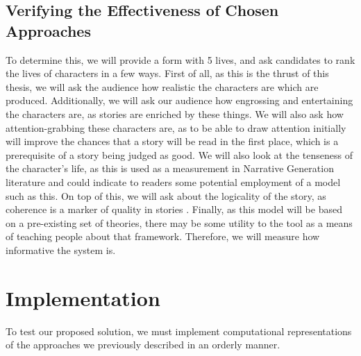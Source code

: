 \documentclass[12pt]{article}
\begin{document}
\subsection{Verifying the Effectiveness of Chosen Approaches}
To determine this, we will provide a form with 5 lives, and ask candidates to rank the lives of characters in a few ways. First of all, as this is the thrust of this thesis, we will ask the audience how realistic the characters are which are produced. Additionally, we will ask our audience how engrossing and entertaining the characters are, as stories are enriched by these things. We will also ask how attention-grabbing these characters are, as to be able to draw attention initially will improve the chances that a story will be read in the first place, which is a prerequisite of a story being judged as good. We will also look at the tenseness of the character's life, as this is used as a measurement in Narrative Generation literature and could indicate to readers some potential employment of a model such as this\cite{questgeneration}. On top of this, we will ask about the logicality of the story, as coherence is a marker of quality in stories \cite{sagarkar-etal-2018-quality}. Finally, as this model will be based on a pre-existing set of theories, there may be some utility to the tool as a means of teaching people about that framework. Therefore, we will measure how informative the system is. 

\section{Implementation}
To test our proposed solution, we must implement computational representations of the approaches we previously described in an orderly manner.
\end{document}
